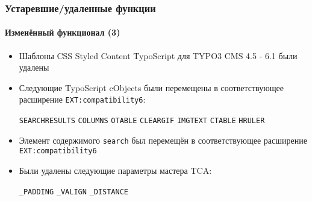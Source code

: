 \begin{frame}[fragile]
	\frametitle{Устаревшие/удаленные функции}
	\framesubtitle{Изменённый функционал (3)}

	\begin{itemize}
		\item Шаблоны CSS Styled Content TypoScript для TYPO3 CMS 4.5 - 6.1 были удалены

		\item Следующие TypoScript cObjects были перемещены в соответствующее расширение
			\texttt{EXT:compatibility6}:

			\vspace{0.2cm}

			\small
				\texttt{SEARCHRESULTS} \tabto{3cm}\texttt{COLUMNS} \tabto{6cm}\texttt{OTABLE} \tabto{9cm}\texttt{CLEARGIF}\newline
				\texttt{IMGTEXT}       \tabto{3cm}\texttt{CTABLE}  \tabto{6cm}\texttt{HRULER}
			\normalsize

		\item Элемент содержимого \texttt{search} был перемещён в соответствующее расширение \texttt{EXT:compatibility6}

		\item Были удалены следующие параметры мастера TCA:

			\vspace{0.2cm}

			\small
				\texttt{\_PADDING} \tabto{3cm}\texttt{\_VALIGN} \tabto{6cm}\texttt{\_DISTANCE}
			\normalsize

	\end{itemize}

\end{frame}


